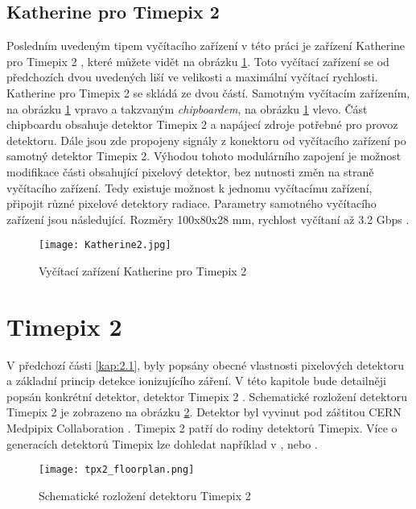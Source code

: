 \subsection{Katherine pro Timepix 2} %
\label{Katherine}
Posledním uvedeným tipem vyčítacího zařízení v této práci je zařízení Katherine pro Timepix 2 \cite{Burian_2020}, které můžete vidět na obrázku \ref{fig:Katherine2}. Toto vyčítací zařízení se od předchozích dvou uvedených liší ve velikosti a maximální vyčítací rychlosti. Katherine pro Timepix 2 se skládá ze dvou částí. Samotným vyčítacím zařízením, na obrázku \ref{fig:Katherine2} vpravo a takzvaným \textit{chipboardem}, na obrázku \ref{fig:Katherine2} vlevo. Část chipboardu obsahuje detektor Timepix 2 a napájecí zdroje potřebné pro provoz detektoru. Dále jsou zde propojeny signály z konektoru od vyčítacího zařízení po samotný detektor Timepix 2. Výhodou tohoto modulárního zapojení je možnost modifikace části obsahující pixelový detektor, bez nutnosti změn na straně vyčítacího zařízení. Tedy existuje možnost k jednomu vyčítacímu zařízení, připojit různé pixelové detektory radiace. Parametry samotného vyčítacího zařízení jsou následující. Rozměry 100x80x28 mm, rychlost vyčítaní až 3.2 Gbps \cite{Burian_2020}.
\begin{figure}[h!]
	\centering
	\captionsetup{justification=centering}
	\texttt{[image: Katherine2.jpg]}
	\caption{Vyčítací zařízení Katherine pro Timepix 2 \cite{Burian_2020}} 
	\label{fig:Katherine2}
\end{figure}	


\section{Timepix 2}
\label{Timepix2}
V předchozí části \ref{kap:2.1}, byly popsány obecné vlastnosti pixelových detektoru a základní princip detekce ionizujícího záření. V této kapitole bude detailněji popsán konkrétní detektor, detektor Timepix 2 \cite{tpx2_manual}. Schematické rozložení detektoru Timepix 2 je zobrazeno na obrázku \ref{fig:tpx2_floorplan}. Detektor byl vyvinut pod záštitou CERN Medpipix Collaboration \cite{Medpix}. Timepix 2 patří do rodiny detektorů Timepix. Více o generacích detektorů Timepix lze dohledat například v \cite{Llopart},  \cite{Timepix3} nebo \cite{Timepix4}.  
\begin{figure}[h!]
	\centering
	\captionsetup{justification=centering}
	\texttt{[image: tpx2\_floorplan.png]}
	\caption{Schematické rozložení detektoru Timepix 2 \cite{tpx2_manual}} 
	\label{fig:tpx2_floorplan}
\end{figure}	

